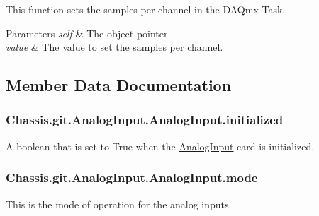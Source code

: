 This function sets the samples per channel in the D\-A\-Qmx Task. 


\begin{DoxyParams}{Parameters}
{\em self} & The object pointer. \\
\hline
{\em value} & The value to set the samples per channel. \\
\hline
\end{DoxyParams}


\subsection{Member Data Documentation}
\hypertarget{class_chassis_8git_1_1_analog_input_1_1_analog_input_ab5ba47e0b3fb604c03340174fe64e080}{
\subsubsection[{initialized}]{\setlength{\rightskip}{0pt plus 5cm}Chassis.\-git.\-Analog\-Input.\-Analog\-Input.\-initialized}}\label{class_chassis_8git_1_1_analog_input_1_1_analog_input_ab5ba47e0b3fb604c03340174fe64e080}


A boolean that is set to True when the \hyperlink{class_chassis_8git_1_1_analog_input_1_1_analog_input}{Analog\-Input} card is initialized. 

\hypertarget{class_chassis_8git_1_1_analog_input_1_1_analog_input_a61eaaf8f916dbc95c11323045b497377}{
\subsubsection[{mode}]{\setlength{\rightskip}{0pt plus 5cm}Chassis.\-git.\-Analog\-Input.\-Analog\-Input.\-mode}}\label{class_chassis_8git_1_1_analog_input_1_1_analog_input_a61eaaf8f916dbc95c11323045b497377}


This is the mode of operation for the analog inputs. 

